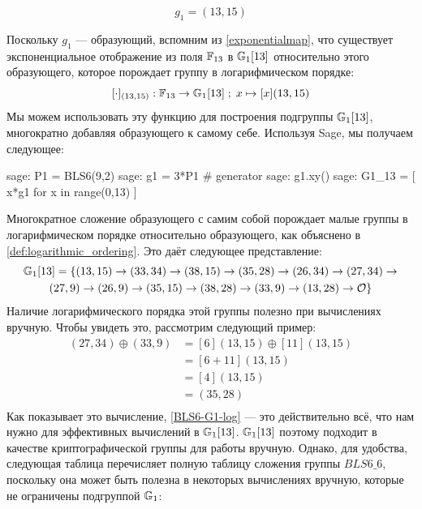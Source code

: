 \begin{equation}\label{gBLS6-6-13}
g_{1} = (13,15)
\end{equation}

Поскольку $g_{1}$ — образующий, вспомним из \ref{exponentialmap}, что существует экспоненциальное отображение из поля $\mathbb{F}_{13}$ в $\mathbb{G}_1[13]$ относительно этого образующего, которое порождает группу в логарифмическом порядке:
$$
[\cdot]_{(13,15)}: \mathbb{F}_{13} \to \mathbb{G}_1[13]\;;\; x \mapsto [x](13,15)
$$ 
Мы можем использовать эту функцию для построения подгруппы $\mathbb{G}_1[13]$, многократно добавляя образующего к самому себе. Используя Sage, мы получаем следующее:
\begin{sagecommandline}
sage: P1 = BLS6(9,2)
sage: g1 = 3*P1 # generator
sage: g1.xy()
sage: G1_13 = [ x*g1 for x in range(0,13) ]
\end{sagecommandline}
Многократное сложение образующего с самим собой порождает малые группы в логарифмическом порядке относительно образующего, как объяснено в \ref{def:logarithmic_ordering}. Это даёт следующее представление:
\begin{multline}
\label{BLS6-G1-log}
\G_1[13]=
\{(13,15) \rightarrow (33,34) \rightarrow  (38,15) \rightarrow  (35,28) \rightarrow (26,34) \rightarrow  (27,34) \rightarrow  \\ 
(27,9)  \rightarrow  (26,9) \rightarrow  (35,15) \rightarrow  (38,28) \rightarrow  (33,9) \rightarrow (13,28) \rightarrow  \mathcal{O}\}$$
\end{multline}
Наличие логарифмического порядка этой группы полезно при вычислениях вручную. Чтобы увидеть это, рассмотрим следующий пример:
\begin{align*}
(27,34)\oplus (33,9)  & = [6](13,15)\oplus [11](13,15)\\
                      & = [6+11](13,15)\\
                      & = [4](13,15)\\
                      & = (35,28)\\
\end{align*}
Как показывает это вычисление, \ref{BLS6-G1-log} — это действительно всё, что нам нужно для эффективных вычислений в $\mathbb{G}_1[13]$. $\mathbb{G}_1[13]$ поэтому подходит в качестве криптографической группы для работы вручную. Однако, для удобства, следующая таблица перечисляет полную таблицу сложения группы $BLS6\_6$, поскольку она может быть полезна в некоторых вычислениях вручную, которые не ограничены подгруппой $\mathbb{G}_1$:
\begingroup
    \fontsize{7pt}{7pt}\selectfont
